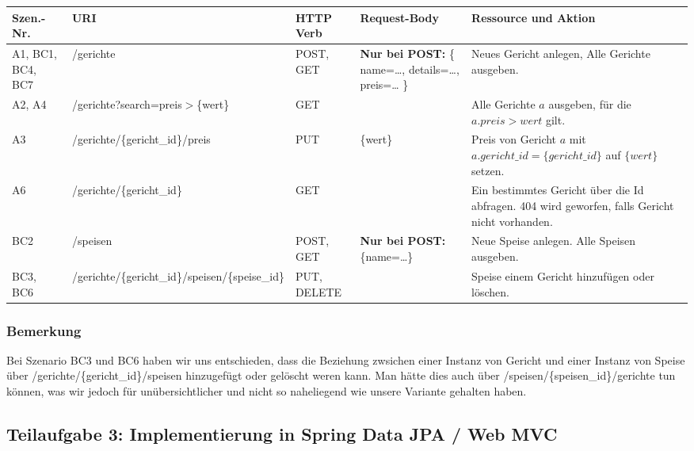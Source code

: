 \begin{tabu} to \linewidth {l|l|X|X|X}
\hline
{}
Szen.-Nr. &URI &HTTP Verb &Request-Body &Ressource und
  Aktion \\
\hline
A1, BC1, BC4, BC7 &/gerichte &POST, GET
  &\textbf{Nur bei POST:}
    \{
      name=\dots,
      details=\dots,
      preis=\dots
    \}
  &Neues Gericht anlegen, 
    Alle Gerichte ausgeben. \\
\hline
A2, A4 &/gerichte?search=preis$>$\{wert\} &GET & &Alle
  Gerichte $a$ ausgeben, f\"ur die $a.preis > wert$ gilt.
  \\
\hline
A3 &/gerichte/\{gericht\_id\}/preis &PUT &\{wert\} &Preis
  von Gericht $a$ mit $a.gericht\_id=\{gericht\_id\}$ auf
  $\{wert\}$ setzen. \\
\hline
A6 &/gerichte/\{gericht\_id\} &GET & &Ein bestimmtes Gericht \"uber die Id
  abfragen. 404 wird geworfen, falls Gericht nicht
  vorhanden. \\
\hline
BC2 &/speisen &POST, GET 
  &\textbf{Nur bei POST:}
  \{name=\dots\} 
  &Neue Speise anlegen. Alle Speisen ausgeben. \\
\hline
BC3, BC6 &/gerichte/\{gericht\_id\}/speisen/\{speise_id\} &PUT, DELETE
  & &Speise einem Gericht hinzuf\"ugen
  oder l\"oschen.
  \\
\end{tabu}

\subsubsection*{Bemerkung}

Bei Szenario BC3 und BC6 haben wir uns entschieden, dass
die Beziehung zwsichen einer Instanz von Gericht und einer
Instanz von Speise \"uber /gerichte/\{gericht\_id\}/speisen
hinzugef\"ugt oder gel\"oscht weren kann. Man h\"atte dies
auch \"uber /speisen/\{speisen\_id\}/gerichte tun k\"onnen,
was wir jedoch f\"ur un\"ubersichtlicher und nicht so
naheliegend wie unsere Variante gehalten haben.


\newpage

\subsection{Teilaufgabe 3: Implementierung in Spring Data
  JPA / Web MVC}

